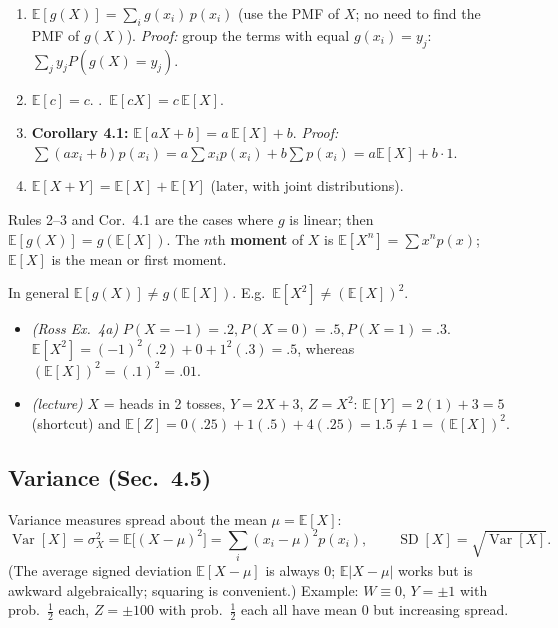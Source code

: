 \documentclass[11pt]{article}
\let\oldsubsection\subsection
\renewcommand{\subsection}{\Needspace{14\baselineskip}\oldsubsection}
\newcommand{\E}{\mathbb{E}}
\newcommand{\Var}{\operatorname{Var}}
\newcommand{\SD}{\operatorname{SD}}
\begin{document}
\begin{thmbox}
\begin{enumerate}
\item $\E[g(X)]=\sum_ig(x_i)\,p(x_i)$ (use the PMF of $X$; no need to find the PMF of $g(X)$). \emph{Proof:} group the terms with equal $g(x_i)=y_j$: $\sum_jy_jP(g(X)=y_j)$.
\item $\E[c]=c$. .\ $\E[cX]=c\,\E[X]$.
\item \textbf{Corollary 4.1:} $\E[aX+b]=a\,\E[X]+b$. \emph{Proof:} $\sum(ax_i+b)p(x_i)=a\sum x_ip(x_i)+b\sum p(x_i)=a\E[X]+b\cdot1$.
\item $\E[X+Y]=\E[X]+\E[Y]$ (later, with joint distributions).
\end{enumerate}
Rules 2--3 and Cor.\ 4.1 are the cases where $g$ is linear; then $\E[g(X)]=g(\E[X])$. The $n$th \textbf{moment} of $X$ is $\E[X^n]=\sum x^np(x)$; $\E[X]$ is the mean or first moment.
\end{thmbox}

\begin{warnbox}
In general $\E[g(X)]\ne g(\E[X])$. E.g.\ $\E[X^2]\ne(\E[X])^2$.
\end{warnbox}

\begin{exbox}[Examples]
\begin{itemize}
\item \emph{(Ross Ex.\ 4a)} $P(X=-1)=.2,P(X=0)=.5,P(X=1)=.3$. $\E[X^2]=(-1)^2(.2)+0+1^2(.3)=.5$, whereas $(\E[X])^2=(.1)^2=.01$.
\item \emph{(lecture)} $X$ = heads in 2 tosses, $Y=2X+3$, $Z=X^2$: $\E[Y]=2(1)+3=5$ (shortcut) and $\E[Z]=0(.25)+1(.5)+4(.25)=1.5\ne1=(\E[X])^2$.
\end{itemize}
\end{exbox}

\subsection{Variance (Sec.\ 4.5)}

\begin{defbox}
Variance measures spread about the mean $\mu=\E[X]$:
\[ \Var[X]=\sigma_X^2=\E\big[(X-\mu)^2\big]=\sum_i(x_i-\mu)^2p(x_i),\qquad \SD[X]=\sqrt{\Var[X]}. \]
(The average signed deviation $\E[X-\mu]$ is always 0; $\E|X-\mu|$ works but is awkward algebraically; squaring is convenient.) Example: $W\equiv0$, $Y=\pm1$ with prob.\ $\frac12$ each, $Z=\pm100$ with prob.\ $\frac12$ each all have mean 0 but increasing spread.
\end{defbox}
\end{document}
